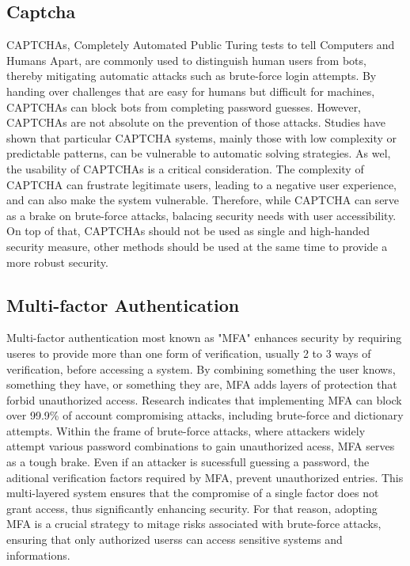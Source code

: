 \documentclass{comjnl}
\begin{document}
\subsection{Captcha}
CAPTCHAs, Completely Automated Public Turing tests to tell Computers and Humans Apart, are commonly used to distinguish human users from bots, thereby mitigating automatic attacks such as brute-force login attempts. By handing over challenges that are easy for humans but difficult for machines, CAPTCHAs can block bots from completing password guesses. However, CAPTCHAs are not absolute on the prevention of those attacks. Studies have shown that particular CAPTCHA systems, mainly those with low complexity or predictable patterns, can be vulnerable to automatic solving strategies. \cite{captcha_description} As wel, the usability of CAPTCHAs is a critical consideration. The complexity of CAPTCHA can frustrate legitimate users, leading to a negative user experience, and can also make the system vulnerable. Therefore, while CAPTCHA can serve as a brake on brute-force attacks, balacing security needs with user accessibility. On top of that, CAPTCHAs should not be used as single and high-handed security measure, other methods should be used at the same time to provide a more robust security. \cite{captcha_types} 

\subsection{Multi-factor Authentication}
Multi-factor authentication most known as "MFA" enhances security by requiring useres to provide more than one form of verification, usually 2 to 3 ways of verification, before accessing a system. By combining something the user knows, something they have, or something they are, MFA adds layers of protection that forbid unauthorized access. Research indicates that implementing MFA can block over 99.9\% of account compromising attacks, including brute-force and dictionary attempts.\cite{mfa_effectiveness} Within the frame of brute-force attacks, where attackers widely attempt various password combinations to gain unauthorized acess, MFA serves as a tough brake. Even if an attacker is sucessfull guessing a password, the aditional verification factors required by MFA, prevent unauthorized entries. This multi-layered system ensures that the compromise of a single factor does not grant access, thus significantly enhancing security.\cite{mfa_brute_force} For that reason, adopting MFA is a crucial strategy to mitage risks associated with brute-force attacks, ensuring that only authorized userss can access sensitive systems and informations.
\end{document}
